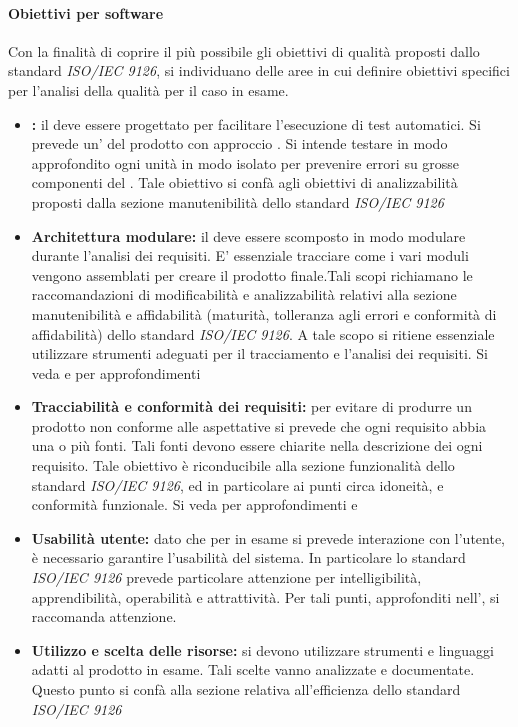 \documentclass[12pt,a4paper]{article}
\begin{document}
\paragraph{Obiettivi per software}
Con la finalità di coprire il più possibile gli obiettivi di qualità proposti dallo standard \textit{ISO/IEC 9126}, si individuano delle aree in cui definire obiettivi specifici per l'analisi della qualità  per il caso in esame.
\begin{itemize}
	\item \textbf{:} il  deve essere progettato per facilitare l'esecuzione di test automatici. Si prevede un'  del prodotto con approccio . Si intende testare in modo approfondito ogni unità  in modo isolato per prevenire errori su grosse componenti del . Tale obiettivo si confà agli obiettivi di analizzabilità proposti dalla sezione manutenibilità dello standard \textit{ISO/IEC 9126}
	\item \textbf{Architettura modulare:} il  deve essere scomposto in modo modulare durante l'analisi dei requisiti. E' essenziale tracciare come i vari moduli vengono assemblati per creare il prodotto finale.Tali scopi richiamano le raccomandazioni di modificabilità e analizzabilità relativi alla sezione manutenibilità e affidabilità (maturità, tolleranza agli errori e conformità di affidabilità) dello standard \textit{ISO/IEC 9126}. A tale scopo si ritiene essenziale utilizzare strumenti adeguati per il tracciamento e l'analisi dei requisiti. Si veda \NdP{} e \AdR{} per approfondimenti
	\item \textbf{Tracciabilità e conformità dei requisiti:} per evitare di produrre un prodotto non conforme alle aspettative si prevede che ogni requisito  abbia una o più fonti. Tali fonti devono essere chiarite nella descrizione dei ogni requisito. Tale obiettivo è riconducibile alla sezione funzionalità dello standard \textit{ISO/IEC 9126}, ed in particolare ai punti circa idoneità, e conformità funzionale. Si veda per approfondimenti \NdP{} e \AdR{}
	\item \textbf{Usabilità utente:} dato che per  in esame si prevede interazione con l'utente, è necessario garantire l'usabilità del sistema. In particolare lo standard \textit{ISO/IEC 9126} prevede particolare attenzione per intelligibilità, apprendibilità, operabilità e attrattività. Per tali punti, approfonditi nell'\FAD, si raccomanda attenzione.
	\item \textbf{Utilizzo e scelta delle risorse:} si devono utilizzare strumenti e linguaggi adatti al prodotto in esame. Tali scelte vanno analizzate e documentate. Questo punto si confà alla sezione relativa all'efficienza dello standard \textit{ISO/IEC 9126}
\end{itemize}
\end{document}
